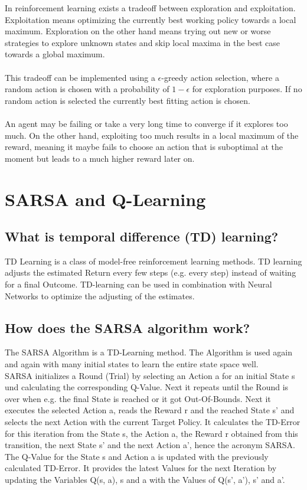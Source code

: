 \documentclass[a4paper, 11pt]{article}
\begin{document}
In reinforcement learning exists a tradeoff between exploration and exploitation.
Exploitation means optimizing the currently best working policy towards a local maximum.
Exploration on the other hand means trying out new or worse strategies to explore unknown states and skip local maxima in the best case towards a global maximum.
\\\\
This tradeoff can be implemented using a $\epsilon$-greedy action selection, where a random action is chosen with a probability of $1-\epsilon$ for exploration purposes.
If no random action is selected the currently best fitting action is chosen.
\\\\
An agent may be failing or take a very long time to converge if it explores too much.
On the other hand, exploiting too much results in a local maximum of the reward, meaning it maybe fails to choose an action that is suboptimal at the moment but leads to a much higher reward later on.

\section{SARSA and Q-Learning}
\subsection{What is temporal difference (TD) learning?}
TD Learning is a class of model-free reinforcement learning methods. TD learning adjusts the estimated Return every few steps (e.g. every step) instead of waiting for a final Outcome. TD-learning can be used in combination with Neural Networks to optimize the adjusting of the estimates.

\subsection{How does the SARSA algorithm work?}
The SARSA Algorithm is a TD-Learning method. The Algorithm is used again and again with many initial states to learn the entire state space well.\\
SARSA initializes a Round (Trial) by selecting an Action a for an initial State s und calculating the corresponding Q-Value. Next it repeats until the Round is over when e.g. the final State is reached or it got Out-Of-Bounds. Next it executes the selected Action a, reads the Reward r and the reached State s' and selects the next Action with the current Target Policy. It calculates the TD-Error for this iteration from the State s, the Action a, the Reward r obtained from this transition, the next State s' and the next Action a', hence the acronym SARSA. The Q-Value for the State s and Action a is updated with the previously calculated TD-Error.
It provides the latest Values for the next Iteration by updating the Variables Q(s, a), s and a with the Values of Q(s', a'), s' and a'.
\end{document}
